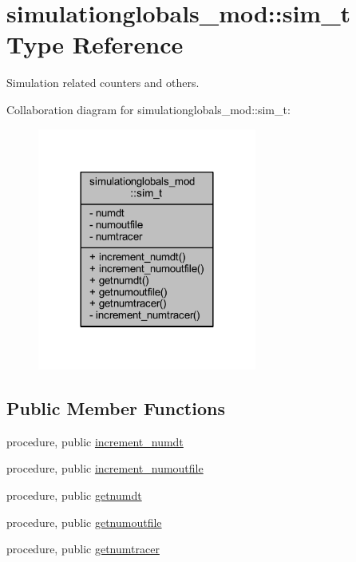 \hypertarget{structsimulationglobals__mod_1_1sim__t}{}\section{simulationglobals\+\_\+mod\+:\+:sim\+\_\+t Type Reference}
\label{structsimulationglobals__mod_1_1sim__t}


Simulation related counters and others.  




Collaboration diagram for simulationglobals\+\_\+mod\+:\+:sim\+\_\+t\+:\nopagebreak
\begin{figure}[H]
\begin{center}
\leavevmode
\includegraphics[width=204pt]{structsimulationglobals__mod_1_1sim__t__coll__graph}
\end{center}
\end{figure}
\subsection*{Public Member Functions}
\begin{DoxyCompactItemize}
\item 
procedure, public \mbox{\hyperlink{structsimulationglobals__mod_1_1sim__t_ade3d2bcc84ed41592b0712a0355be108}{increment\+\_\+numdt}}
\item 
procedure, public \mbox{\hyperlink{structsimulationglobals__mod_1_1sim__t_af7f7dad94e8a2de058fe88d0d795aac1}{increment\+\_\+numoutfile}}
\item 
procedure, public \mbox{\hyperlink{structsimulationglobals__mod_1_1sim__t_a4f67d96ae861d1600d365cc86acbc1a7}{getnumdt}}
\item 
procedure, public \mbox{\hyperlink{structsimulationglobals__mod_1_1sim__t_abdb9a18d07e725c9c99423978f014c4c}{getnumoutfile}}
\item 
procedure, public \mbox{\hyperlink{structsimulationglobals__mod_1_1sim__t_af581a3f3854589b767c95bf4b3d3a388}{getnumtracer}}
\end{DoxyCompactItemize}
